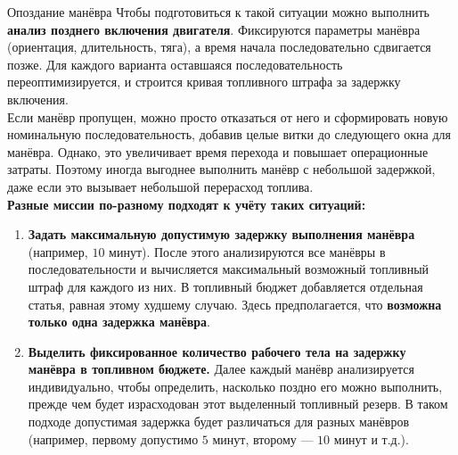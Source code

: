 \documentclass[8pt]{beamer}
\begin{document}
\begin{frame}{Опоздание манёвра}
Чтобы подготовиться к такой ситуации можно выполнить \textbf{анализ позднего включения двигателя}. Фиксируются параметры манёвра (ориентация, длительность, тяга), а время начала последовательно сдвигается позже. Для каждого варианта оставшаяся последовательность переоптимизируется, и строится кривая топливного штрафа за задержку включения. \\
\smallskip
Если манёвр пропущен, можно просто отказаться от него и сформировать новую номинальную последовательность, добавив целые витки до следующего окна для манёвра. Однако, это увеличивает время перехода и повышает операционные затраты. Поэтому иногда выгоднее выполнить манёвр с небольшой задержкой, даже если это вызывает небольшой перерасход топлива. \\
\smallskip
\textbf{Разные миссии по-разному подходят к учёту таких ситуаций:}
\begin{enumerate}
    \item \textbf{Задать максимальную допустимую задержку выполнения манёвра} (например, $10$ минут). После этого анализируются все манёвры в последовательности и вычисляется максимальный возможный топливный штраф для каждого из них. В топливный бюджет добавляется отдельная статья, равная этому худшему случаю. Здесь предполагается, что \textbf{возможна только одна задержка манёвра}.

    \item \textbf{Выделить фиксированное количество рабочего тела на задержку манёвра в топливном бюджете.} Далее каждый манёвр анализируется индивидуально, чтобы определить, насколько поздно его можно выполнить, прежде чем будет израсходован этот выделенный топливный резерв. В таком подходе допустимая задержка будет различаться для разных манёвров (например, первому допустимо $5$ минут, второму — $10$ минут и т.д.).
\end{enumerate}
\end{frame}
\end{document}
